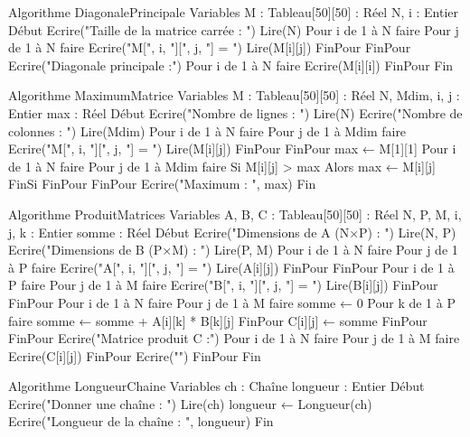 \begin{algo}
Algorithme DiagonalePrincipale
Variables
    M : Tableau[50][50] : Réel
    N, i : Entier
Début
    Ecrire("Taille de la matrice carrée : ")
    Lire(N)
    Pour i de 1 à N faire
        Pour j de 1 à N faire
            Ecrire("M[", i, "][", j, "] = ")
            Lire(M[i][j])
        FinPour
    FinPour
    Ecrire("Diagonale principale :")
    Pour i de 1 à N faire
        Ecrire(M[i][i])
    FinPour
Fin
\end{algo}

\begin{algo}
Algorithme MaximumMatrice
Variables
    M : Tableau[50][50] : Réel
    N, Mdim, i, j : Entier
    max : Réel
Début
    Ecrire("Nombre de lignes : ")
    Lire(N)
    Ecrire("Nombre de colonnes : ")
    Lire(Mdim)
    Pour i de 1 à N faire
        Pour j de 1 à Mdim faire
            Ecrire("M[", i, "][", j, "] = ")
            Lire(M[i][j])
        FinPour
    FinPour
    max ← M[1][1]
    Pour i de 1 à N faire
        Pour j de 1 à Mdim faire
            Si M[i][j] > max Alors
                max ← M[i][j]
            FinSi
        FinPour
    FinPour
    Ecrire("Maximum : ", max)
Fin
\end{algo}

\begin{algo}
Algorithme ProduitMatrices
Variables
    A, B, C : Tableau[50][50] : Réel
    N, P, M, i, j, k : Entier
    somme : Réel
Début
    Ecrire("Dimensions de A (N×P) : ")
    Lire(N, P)
    Ecrire("Dimensions de B (P×M) : ")
    Lire(P, M)
    Pour i de 1 à N faire
        Pour j de 1 à P faire
            Ecrire("A[", i, "][", j, "] = ")
            Lire(A[i][j])
        FinPour
    FinPour
    Pour i de 1 à P faire
        Pour j de 1 à M faire
            Ecrire("B[", i, "][", j, "] = ")
            Lire(B[i][j])
        FinPour
    FinPour
    Pour i de 1 à N faire
        Pour j de 1 à M faire
            somme ← 0
            Pour k de 1 à P faire
                somme ← somme + A[i][k] * B[k][j]
            FinPour
            C[i][j] ← somme
        FinPour
    FinPour
    Ecrire("Matrice produit C :")
    Pour i de 1 à N faire
        Pour j de 1 à M faire
            Ecrire(C[i][j])
        FinPour
        Ecrire("")
    FinPour
Fin
\end{algo}

\begin{algo}
Algorithme LongueurChaine
Variables
    ch : Chaîne
    longueur : Entier
Début
    Ecrire("Donner une chaîne : ")
    Lire(ch)
    longueur ← Longueur(ch)
    Ecrire("Longueur de la chaîne : ", longueur)
Fin
\end{algo}

